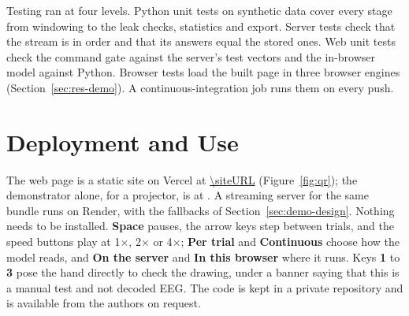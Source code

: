 Testing ran at four levels. Python unit tests on synthetic data cover every stage from
windowing to the leak checks, statistics and export. Server tests check that the stream
is in order and that its answers equal the stored ones. Web unit tests check the command
gate against the server's test vectors and the in-browser model against Python. Browser
tests load the built page in three browser engines (Section~\ref{sec:res-demo}). A
continuous-integration job runs them on every push.

\section{Deployment and Use}\label{sec:deploy}

The web page is a static site on Vercel at \url{\siteURL} (Figure~\ref{fig:qr}); the
demonstrator alone, for a projector, is at . A streaming server for the same
bundle runs on Render, with the fallbacks of Section~\ref{sec:demo-design}. Nothing needs
to be installed.
\textbf{Space} pauses, the arrow keys step between trials, and the speed buttons play at
1$\times$, 2$\times$ or 4$\times$; \textbf{Per trial} and \textbf{Continuous} choose how the
model reads, and \textbf{On the server} and \textbf{In this browser} where it runs. Keys
\textbf{1} to \textbf{3} pose the hand directly to check the drawing, under a banner saying
that this is a manual test and not decoded EEG. The code is kept in a private repository and is available from the authors on request.

